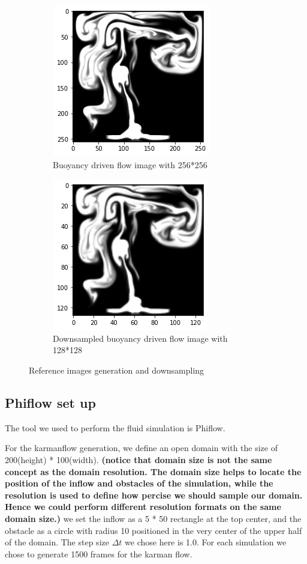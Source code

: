 \documentclass[a4paper,12pt,twoside]{report}
\begin{document}
\begin{figure}
\centering
\begin{subfigure}{0.4\textwidth}
  \centering
  \includegraphics[scale=0.5]{buoyancy_high.png}
  \caption{Buoyancy driven flow image with 256*256}
\end{subfigure}
\begin{subfigure}{0.4\textwidth}
  \centering
  \includegraphics[scale=0.5]{buoyancy_ds.png}
  \caption{Downsampled buoyancy driven flow image with 128*128}
\end{subfigure}
\caption{Reference images generation and downsampling}
\end{figure}
\subsection{Phiflow set up}
The tool we used to perform the fluid simulation is Phiflow\cite{holl2020learning}. 

For the karmanflow generation, we define an open domain with the size of 200(height) * 100(width). \textbf{(notice that domain size is not the same concept as the domain resolution. The domain size helps to locate the position of the inflow and obstacles of the simulation, while the resolution is used to define how percise we should sample our domain. Hence we could perform different resolution formats on the same domain size.)} we set the inflow as a 5 * 50 rectangle at the top center, and the obstacle as a circle with radius 10 positioned in the very center of the upper half of the domain. The step size $\Delta t$ we chose here is 1.0. For each simulation we chose to generate 1500 frames for the karman flow.
\end{document}
